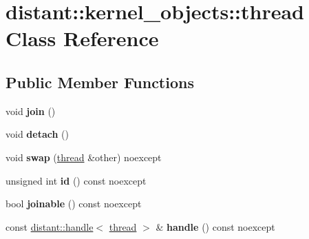 \hypertarget{classdistant_1_1kernel__objects_1_1thread}{}\section{distant\+:\+:kernel\+\_\+objects\+:\+:thread Class Reference}
\label{classdistant_1_1kernel__objects_1_1thread}
\subsection*{Public Member Functions}
\begin{DoxyCompactItemize}
\item 
\mbox{\label{classdistant_1_1kernel__objects_1_1thread_a512cd30df2cd62136b004c71b559b870}} 
void {\bfseries join} ()
\item 
\mbox{\label{classdistant_1_1kernel__objects_1_1thread_a5831cdd5ad10a869e419d80638a14352}} 
void {\bfseries detach} ()
\item 
\mbox{\label{classdistant_1_1kernel__objects_1_1thread_a48906753faf5873948c6862bcee13057}} 
void {\bfseries swap} (\mbox{\hyperlink{classdistant_1_1kernel__objects_1_1thread}{thread}} \&other) noexcept
\item 
\mbox{\label{classdistant_1_1kernel__objects_1_1thread_ad65a1b00c3aa79c504e328afc9673684}} 
unsigned int {\bfseries id} () const noexcept
\item 
\mbox{\label{classdistant_1_1kernel__objects_1_1thread_a8acda3802aea3811cadb932b7b59e0da}} 
bool {\bfseries joinable} () const noexcept
\item 
\mbox{\label{classdistant_1_1kernel__objects_1_1thread_a528e3ad13c927f14ca156b9b502387ef}} 
const \mbox{\hyperlink{classdistant_1_1handle}{distant\+::handle}}$<$ \mbox{\hyperlink{classdistant_1_1kernel__objects_1_1thread}{thread}} $>$ \& {\bfseries handle} () const noexcept
\item 
\mbox{\label{classdistant_1_1kernel__objects_1_1thread_ae078a839ced841194bd200c58a0e1dba}} 

\end{DoxyCompactItemize}
